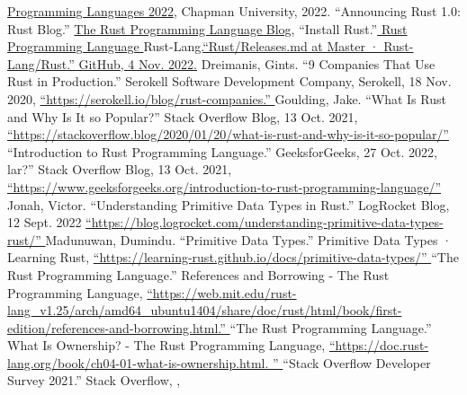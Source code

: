 \documentclass{article}
\theoremstyle{theorem}
\theoremstyle{definition}
\theoremstyle{remark}
\begin{document}
\begin{thebibliography}{99}
 \href{https://github.com/alexhkurz/programming-languages-2022/blob/main/README.md}{Programming Languages 2022}, Chapman University, 2022.
“Announcing Rust 1.0: Rust Blog.” \href{https://blog.rust-lang.org/2015/05/15/Rust-1.0.html}{The Rust Programming Language Blog},
 “Install Rust.”\href{https://github.com/alexhkurz/programming-languages-2022/blob/main/README.md}{ Rust Programming Language }
Rust-Lang.\href{https://github.com/rust-lang/rust/blob/master/RELEASES.md}  {“Rust/Releases.md at Master · Rust-Lang/Rust.” GitHub, 4 Nov. 2022.} 
Dreimanis, Gints. “9 Companies That Use Rust in Production.” Serokell Software Development Company, Serokell, 18 Nov. 2020,
\href{https://serokell.io/blog/rust-companies}  {“https://serokell.io/blog/rust-companies.” } 
Goulding, Jake. “What Is Rust and Why Is It so Popular?” Stack Overflow Blog, 13 Oct. 2021,
\href{https://stackoverflow.blog/2020/01/20/what-is-rust-and-why-is-it-so-popular/}  {“https://stackoverflow.blog/2020/01/20/what-is-rust-and-why-is-it-so-popular/” } 
“Introduction to Rust Programming Language.” GeeksforGeeks, 27 Oct. 2022, 
lar?” Stack Overflow Blog, 13 Oct. 2021,
\href{https://www.geeksforgeeks.org/introduction-to-rust-programming-language/}  {“https://www.geeksforgeeks.org/introduction-to-rust-programming-language/” } 
Jonah, Victor. “Understanding Primitive Data Types in Rust.” LogRocket Blog, 12 Sept. 2022
\href{https://blog.logrocket.com/understanding-primitive-data-types-rust/}  {“https://blog.logrocket.com/understanding-primitive-data-types-rust/” }
Madunuwan, Dumindu. “Primitive Data Types.” Primitive Data Types · Learning Rust, 
\href{https://learning-rust.github.io/docs/primitive-data-types/}  {“https://learning-rust.github.io/docs/primitive-data-types/” }
“The Rust Programming Language.” References and Borrowing - The Rust Programming Language, 
\href{https://web.mit.edu/rust-lang_v1.25/arch/amd64_ubuntu1404/share/doc/rust/html/book/first-edition/references-and-borrowing.html.}  {“https://web.mit.edu/rust-lang_v1.25/arch/amd64_ubuntu1404/share/doc/rust/html/book/first-edition/references-and-borrowing.html.” }
“The Rust Programming Language.” What Is Ownership? - The Rust Programming Language,
\href{https://doc.rust-lang.org/book/ch04-01-what-is-ownership.html.
}  {“https://doc.rust-lang.org/book/ch04-01-what-is-ownership.html.
” }
“Stack Overflow Developer Survey 2021.” Stack Overflow, ,

\end{thebibliography}
\end{document}
